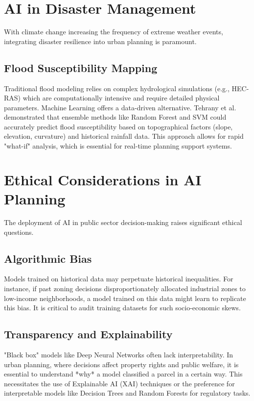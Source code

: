 \documentclass[12pt,a4paper]{report}
\begin{document}
\section{AI in Disaster Management}
With climate change increasing the frequency of extreme weather events, integrating disaster resilience into urban planning is paramount.

\subsection{Flood Susceptibility Mapping}
Traditional flood modeling relies on complex hydrological simulations (e.g., HEC-RAS) which are computationally intensive and require detailed physical parameters. Machine Learning offers a data-driven alternative. Tehrany et al. \cite{tehrany2014flood} demonstrated that ensemble methods like Random Forest and SVM could accurately predict flood susceptibility based on topographical factors (slope, elevation, curvature) and historical rainfall data. This approach allows for rapid "what-if" analysis, which is essential for real-time planning support systems.

\section{Ethical Considerations in AI Planning}
The deployment of AI in public sector decision-making raises significant ethical questions.

\subsection{Algorithmic Bias}
Models trained on historical data may perpetuate historical inequalities. For instance, if past zoning decisions disproportionately allocated industrial zones to low-income neighborhoods, a model trained on this data might learn to replicate this bias. It is critical to audit training datasets for such socio-economic skews.

\subsection{Transparency and Explainability}
"Black box" models like Deep Neural Networks often lack interpretability. In urban planning, where decisions affect property rights and public welfare, it is essential to understand *why* a model classified a parcel in a certain way. This necessitates the use of Explainable AI (XAI) techniques or the preference for interpretable models like Decision Trees and Random Forests for regulatory tasks.
\end{document}

